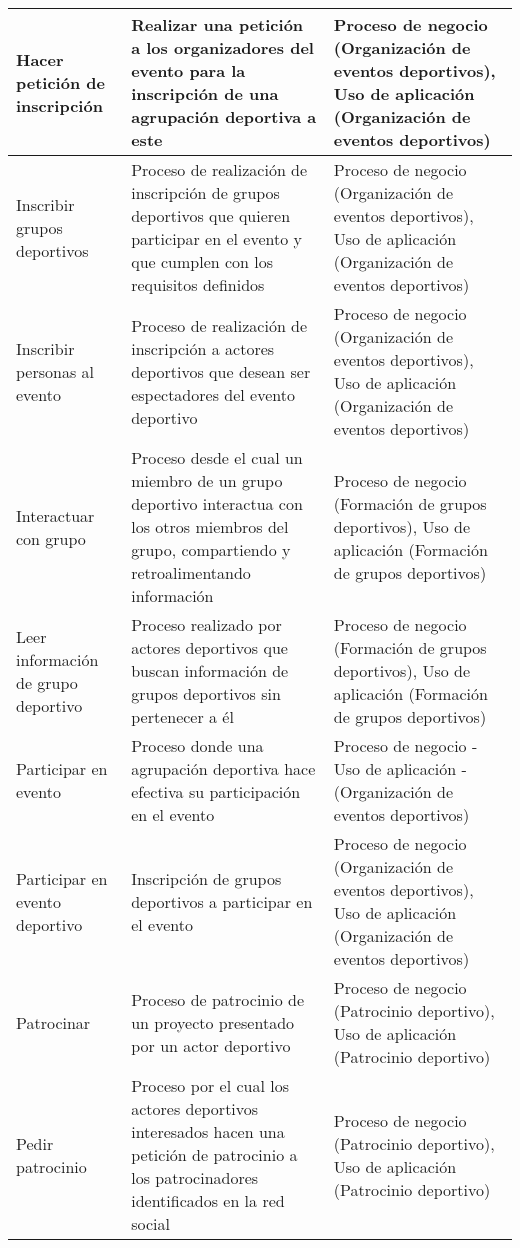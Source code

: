 \begin{center}
\begin{longtable}{|p{4cm}|p{7cm}|p{4cm}|}
		Hacer petición de inscripción & 
		Realizar una petición a los organizadores del evento para la inscripción de una agrupación deportiva a este & 
		Proceso de negocio (Organización de eventos deportivos), Uso de aplicación (Organización de eventos deportivos)
		\\
		\hline
		Inscribir grupos deportivos & 
		Proceso de realización de inscripción de grupos deportivos que quieren participar en el evento y que cumplen con los requisitos definidos & 
		Proceso de negocio (Organización de eventos deportivos), Uso de aplicación (Organización de eventos deportivos)
		\\
		\hline
		Inscribir personas al evento & 
		Proceso de realización de inscripción a actores deportivos que desean ser espectadores del evento deportivo & 
		Proceso de negocio (Organización de eventos deportivos), Uso de aplicación (Organización de eventos deportivos)
		\\
		\hline
		Interactuar con grupo & 
		Proceso desde el cual un miembro de un grupo deportivo interactua con los otros miembros del grupo, compartiendo y retroalimentando información & 
		Proceso de negocio (Formación de grupos deportivos), Uso de aplicación (Formación de grupos deportivos)
		\\
		\hline
		Leer información de grupo deportivo & 
		Proceso realizado por actores deportivos que buscan información de grupos deportivos sin pertenecer a él & 
		Proceso de negocio (Formación de grupos deportivos), Uso de aplicación (Formación de grupos deportivos)
		\\
		\hline
		Participar en evento & 
		Proceso donde una agrupación deportiva hace efectiva su participación en el evento & 
		Proceso de negocio - Uso de aplicación - (Organización de eventos deportivos)
		\\
		\hline
		Participar en evento deportivo & 
		Inscripción de grupos deportivos a participar en el evento & 
		Proceso de negocio (Organización de eventos deportivos), Uso de aplicación (Organización de eventos deportivos)
		\\
		\hline
		Patrocinar & 
		Proceso de patrocinio de un proyecto presentado por un actor deportivo & 
		Proceso de negocio (Patrocinio deportivo), Uso de aplicación (Patrocinio deportivo)
		\\
		\hline
		Pedir patrocinio & 
		Proceso por el cual los actores deportivos interesados hacen una petición de patrocinio a los patrocinadores identificados en la red social & 
		Proceso de negocio (Patrocinio deportivo), Uso de aplicación (Patrocinio deportivo)

\end{longtable}
\end{center}
